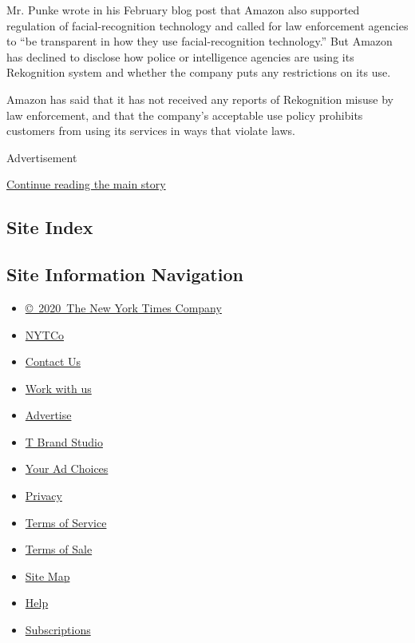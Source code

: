 Mr. Punke wrote in his February blog post that Amazon also supported
regulation of facial-recognition technology and called for law
enforcement agencies to ``be transparent in how they use
facial-recognition technology.'' But Amazon has declined to disclose how
police or intelligence agencies are using its Rekognition system and
whether the company puts any restrictions on its use.

Amazon has said that it has not received any reports of Rekognition
misuse by law enforcement, and that the company's acceptable use policy
prohibits customers from using its services in ways that violate laws.

Advertisement

\protect\hyperlink{after-bottom}{Continue reading the main story}

\hypertarget{site-index}{%
\subsection{Site Index}\label{site-index}}

\hypertarget{site-information-navigation}{%
\subsection{Site Information
Navigation}\label{site-information-navigation}}

\begin{itemize}
\tightlist
\item
  \href{https://help.nytimes3xbfgragh.onion/hc/en-us/articles/115014792127-Copyright-notice}{©~2020~The
  New York Times Company}
\end{itemize}

\begin{itemize}
\tightlist
\item
  \href{https://www.nytco.com/}{NYTCo}
\item
  \href{https://help.nytimes3xbfgragh.onion/hc/en-us/articles/115015385887-Contact-Us}{Contact
  Us}
\item
  \href{https://www.nytco.com/careers/}{Work with us}
\item
  \href{https://nytmediakit.com/}{Advertise}
\item
  \href{http://www.tbrandstudio.com/}{T Brand Studio}
\item
  \href{https://www.nytimes3xbfgragh.onion/privacy/cookie-policy\#how-do-i-manage-trackers}{Your
  Ad Choices}
\item
  \href{https://www.nytimes3xbfgragh.onion/privacy}{Privacy}
\item
  \href{https://help.nytimes3xbfgragh.onion/hc/en-us/articles/115014893428-Terms-of-service}{Terms
  of Service}
\item
  \href{https://help.nytimes3xbfgragh.onion/hc/en-us/articles/115014893968-Terms-of-sale}{Terms
  of Sale}
\item
  \href{https://spiderbites.nytimes3xbfgragh.onion}{Site Map}
\item
  \href{https://help.nytimes3xbfgragh.onion/hc/en-us}{Help}
\item
  \href{https://www.nytimes3xbfgragh.onion/subscription?campaignId=37WXW}{Subscriptions}
\end{itemize}
